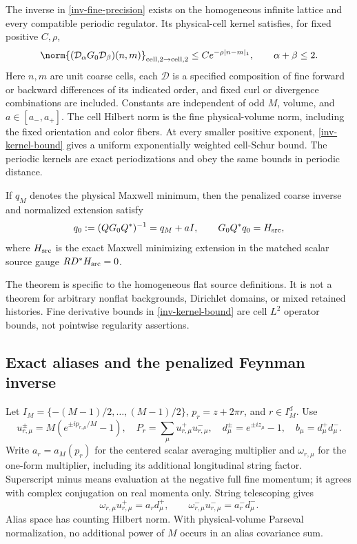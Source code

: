 \begin{theorem}\label{inv-theorem}
The inverse in \eqref{inv-fine-precision} exists on the homogeneous
infinite lattice and every compatible periodic regulator. Its
physical-cell kernel satisfies, for fixed positive $C,\rho$,
\begin{equation}\label{inv-kernel-bound}
 \norm{(\mathcal D_\alpha G_0\mathcal D_\beta)(n,m)}
 _{\mathrm{cell},2\to\mathrm{cell},2}
 \le Ce^{-\rho|n-m|_1},\qquad \alpha+\beta\le2.
\end{equation}
Here $n,m$ are unit coarse cells, each $\mathcal D$ is a specified
composition of fine forward or backward differences of its indicated
order, and fixed curl or divergence combinations are included.
Constants are independent of odd $M$, volume, and $a\in[a_-,a_+]$.
The cell Hilbert norm is the fine physical-volume norm, including the
fixed orientation and color fibers. At every smaller positive exponent,
\eqref{inv-kernel-bound} gives a uniform exponentially weighted
cell-Schur bound. The periodic kernels are exact periodizations and
obey the same bounds in periodic distance.

If $q_M$ denotes the physical Maxwell minimum, then the penalized
coarse inverse and normalized extension satisfy
\begin{equation}\label{inv-coarse-result}
 q_0:=(QG_0Q^*)^{-1}=q_M+aI,
 \qquad G_0Q^*q_0=H_{\rm src},
\end{equation}
where $H_{\rm src}$ is the exact Maxwell minimizing extension in the
matched scalar source gauge $RD^*H_{\rm src}=0$.
\end{theorem}

The theorem is specific to the homogeneous flat source definitions.
It is not a theorem for arbitrary nonflat backgrounds, Dirichlet
domains, or mixed retained histories. Fine derivative bounds in
\eqref{inv-kernel-bound} are cell $L^2$ operator bounds, not
pointwise regularity assertions.

\subsection{Exact aliases and the penalized Feynman inverse}

Let $I_M=\{-(M-1)/2,\ldots,(M-1)/2\}$,
$p_r=z+2\pi r$, and $r\in I_M^d$. Use
\[
 u_{r,\mu}^{\pm}=M(e^{\pm ip_{r,\mu}/M}-1),\quad
 P_r=\sum_\mu u_{r,\mu}^+u_{r,\mu}^-,\quad
 d_\mu^\pm=e^{\pm iz_\mu}-1,\quad b_\mu=d_\mu^+d_\mu^-.
\]
Write $a_r=a_M(p_r)$ for the centered scalar averaging multiplier
and $\omega_{r,\mu}$ for the one-form multiplier, including its
additional longitudinal string factor. Superscript minus means
evaluation at the negative full fine momentum; it agrees with
complex conjugation on real momenta only. String telescoping gives
\begin{equation}\label{inv-cochain}
 \omega_{r,\mu}u_{r,\mu}^+=a_r d_\mu^+,
 \qquad \omega_{r,\mu}^-u_{r,\mu}^-=a_r^-d_\mu^-.
\end{equation}
Alias space has counting Hilbert norm. With physical-volume Parseval
normalization, no additional power of $M$ occurs in an alias covariance
sum.

